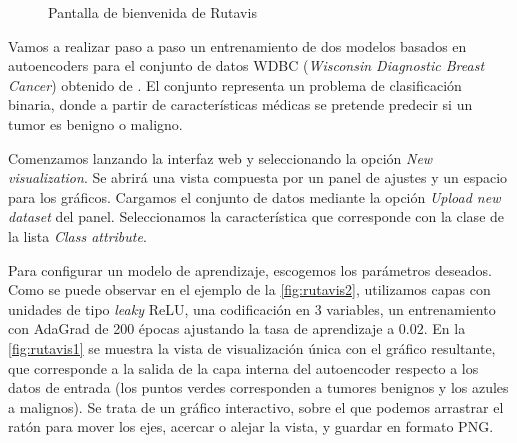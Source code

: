 \begin{figure}[hbtp]
  \centering
  \caption[Interfaz gráfica de Rutavis]{Pantalla de bienvenida de Rutavis}
  \label{fig:rutavis-welcome}
\end{figure}

Vamos a realizar paso a paso un entrenamiento de dos modelos basados en autoencoders para el conjunto de datos WDBC (\emph{Wisconsin Diagnostic Breast Cancer}) obtenido de \autocite{Lichman:2013}. El conjunto representa un problema de clasificación binaria, donde a partir de características médicas se pretende predecir si un tumor es benigno o maligno.

Comenzamos lanzando la interfaz web y seleccionando la opción \emph{New visualization}. Se abrirá una vista compuesta por un panel de ajustes y un espacio para los gráficos. Cargamos el conjunto de datos mediante la opción \emph{Upload new dataset} del panel. Seleccionamos la característica que corresponde con la clase de la lista \emph{Class attribute}.

Para configurar un modelo de aprendizaje, escogemos los parámetros deseados. Como se puede observar en el ejemplo de la \autoref{fig:rutavis2}, utilizamos capas con unidades de tipo \emph{leaky} ReLU, una codificación en 3 variables, un entrenamiento con AdaGrad de 200 épocas ajustando la tasa de aprendizaje a $0.02$. En la \autoref{fig:rutavis1} se muestra la vista de visualización única con el gráfico resultante, que corresponde a la salida de la capa interna del autoencoder respecto a los datos de entrada (los puntos verdes corresponden a tumores benignos y los azules a malignos). Se trata de un gráfico interactivo, sobre el que podemos arrastrar el ratón para mover los ejes, acercar o alejar la vista, y guardar en formato PNG.

